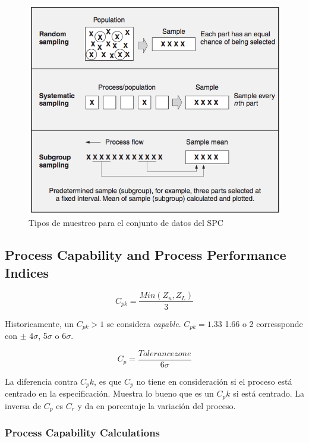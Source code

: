 \documentclass[]{article}
\begin{document}
\begin{figure}[H]
	\centering
	\includegraphics[width=120mm]{imagenes/SamplingSPC.png}
	\caption{Tipos de muestreo para el conjunto de datos del SPC}
	\label{fig:SamplingSPC}
\end{figure}


\subsection{Process Capability and Process Performance Indices}

\begin{equation}
C_{pk} = \frac{Min(Z_u,Z_L)}{3}
\end{equation}

Historicamente, un $C_{pk} > 1$ se considera \textit{capable}. $C_{pk} = 1.33$ 1.66 o 2 corressponde con $\pm$ 4$\sigma$, 5$\sigma$ o 6$\sigma$.

\begin{equation}
C_p = \frac{Tolerance zone}{6\sigma}
\end{equation}

La diferencia contra $C_pk$, es que $C_p$ no tiene en consideración si el proceso está centrado en la especificación. Muestra lo bueno que es un $C_pk$ si está centrado. La inversa de $C_p$ es $C_r$ y da en porcentaje la variación del proceso.

\subsubsection{Process Capability Calculations}
\end{document}
